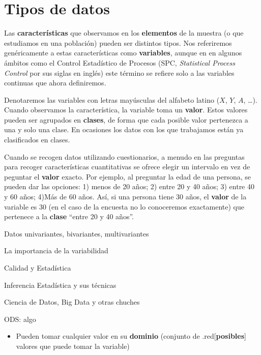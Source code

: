 \documentclass[
]{book}
\providecommand{\tightlist}{%
  \setlength{\itemsep}{0pt}\setlength{\parskip}{0pt}}
\begin{document}
\hypertarget{tipos-de-datos}{%
\section{Tipos de datos}\label{tipos-de-datos}}

Las \textbf{características} que observamos en los \textbf{elementos} de la muestra
(o que estudiamos en una población) pueden ser distintos tipos. Nos referiremos
genéricamente a estas características como \textbf{variables}, aunque en en algunos
ámbitos como el Control Estadístico de Procesos (SPC, \emph{Statistical Process Control}
por sus siglas en inglés) este término se refiere solo a las variables continuas
que ahora definiremos.

Denotaremos las variables con letras mayúsculas del alfabeto latino (\(X\), \(Y\), \(A\), \ldots).
Cuando observamos la característica, la variable toma un \textbf{valor}. Estos valores
pueden ser agrupados en \textbf{clases}, de forma que cada posible valor
pertenezca a una y solo una clase. En ocasiones los datos con los que trabajamos
están ya clasificados en clases.

\begin{rmdejemplo}
Cuando se recogen datos utilizando cuestionarios, a menudo en las preguntas
para recoger características cuantitativas se ofrece elegir un intervalo en vez
de peguntar el \textbf{valor} exacto. Por ejemplo, al preguntar la edad de una
persona, se pueden dar las opciones: 1) menos de 20 años; 2) entre 20 y 40 años;
3) entre 40 y 60 años; 4)Más de 60 años. Así, si una persona tiene 30 años, el \textbf{valor}
de la variable es 30 (en el caso de la encuesta no lo conoceremos exactamente)
que pertenece a la \textbf{clase} ``entre 20 y 40 años''.

\end{rmdejemplo}

Datos univariantes, bivariantes, multivariantes

La importancia de la variabilidad

Calidad y Estadística

Inferencia Estadística y sus técnicas

Ciencia de Datos, Big Data y otras chuches

ODS: algo

\begin{itemize}
\tightlist
\item
  Pueden tomar cualquier valor en su \textbf{dominio} (conjunto de .red{[}\textbf{posibles}{]} valores que puede tomar la variable)
\end{itemize}
\end{document}
